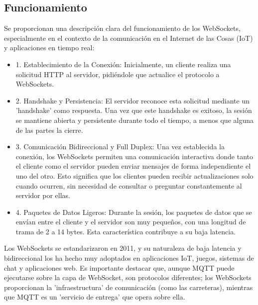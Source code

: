 \documentclass{report}
\begin{document}
\subsection{Funcionamiento}
Se proporcionan una descripción clara del funcionamiento de los WebSockets, especialmente en el contexto de la comunicación en el 
Internet de las Cosas (IoT) y aplicaciones en tiempo real:
\begin{itemize}
    \item 1. Establecimiento de la Conexión: Inicialmente, un cliente realiza una solicitud HTTP al servidor, pidiéndole que actualice el 
    protocolo a WebSockets.
    \item 2. Handshake y Persistencia: El servidor reconoce esta solicitud mediante un 'handshake' como respuesta. Una vez que este 
    handshake es exitoso, la sesión se mantiene abierta y persistente durante todo el tiempo, a menos que alguna de las partes la cierre.
    \item 3. Comunicación Bidireccional y Full Duplex: Una vez establecida la conexión, los WebSockets permiten una comunicación interactiva 
    donde tanto el cliente como el servidor pueden enviar mensajes de forma independiente el uno del otro. Esto significa que los clientes 
    pueden recibir actualizaciones solo cuando ocurren, sin necesidad de consultar o preguntar constantemente al servidor por ellas.
    \item 4. Paquetes de Datos Ligeros: Durante la sesión, los paquetes de datos que se envían entre el cliente y el servidor son muy 
    pequeños, con una longitud de trama de 2 a 14 bytes. Esta característica contribuye a su baja latencia.
\end{itemize}
Los WebSockets se estandarizaron en 2011, y su naturaleza de baja latencia y bidireccional los ha hecho muy adoptados en aplicaciones IoT, 
juegos, sistemas de chat y aplicaciones web. Es importante destacar que, aunque MQTT puede ejecutarse sobre la capa de WebSocket, son 
protocolos diferentes; los WebSockets proporcionan la 'infraestructura' de comunicación (como las carreteras), mientras que MQTT es un 
'servicio de entrega' que opera sobre ella.
\end{document}
